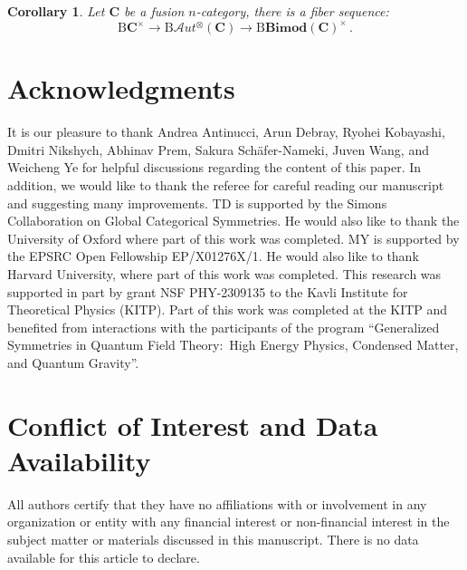 \documentclass[11pt,reqno]{amsart}
\numberwithin{equation}{section}
\theoremstyle{plain}
\newtheorem{cor}[equation]{Corollary}
\theoremstyle{definition}
\begin{document}
\begin{cor}\label{cor:thefibersequence}
Let $\mathbf{C}$ be a fusion $n$-category, there is a fiber sequence:
$$\mathrm{B}\mathbf{C}^{\times}\rightarrow\mathrm{B}\mathscr{A}ut^{\otimes}(\mathbf{C})\rightarrow\mathrm{B}\mathbf{Bimod}(\mathbf{C})^{\times}\,.$$
\end{cor}

\section*{Acknowledgments}

It is our pleasure to thank
Andrea Antinucci,
Arun Debray,
Ryohei Kobayashi,
Dmitri Nikshych,
Abhinav Prem,
Sakura Schäfer-Nameki,
Juven Wang, and
Weicheng Ye
for helpful discussions regarding the content of this paper.
In addition, we would like to thank the referee for careful reading our manuscript and suggesting many improvements.
TD is supported by the Simons Collaboration on Global Categorical Symmetries. He would also like to thank the University of Oxford where part of this work was completed. 
MY is supported by the EPSRC Open Fellowship EP/X01276X/1. He would also like to thank Harvard University, where part of this work was completed.
This research was supported in part by grant NSF PHY-2309135 to the Kavli Institute for Theoretical Physics (KITP). Part of this work
was completed at the KITP and benefited from interactions with the participants of the  program “Generalized
Symmetries in Quantum Field Theory:\ High Energy Physics, Condensed Matter, and Quantum
Gravity”. 

\section*{Conflict of Interest and Data Availability}
All authors certify that they have no affiliations with or involvement in any organization or entity with any financial interest or non-financial interest in the subject matter or materials discussed in this manuscript.  There is no data available
for this article to declare.


\end{document}
